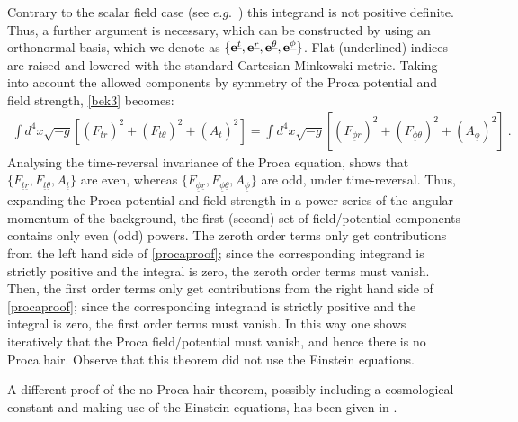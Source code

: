 \documentclass{article}
\numberwithin{equation}{section}
\begin{document}
Contrary to the scalar field case (see $e.g.$~\cite{Herdeiro:2015waa}) this integrand is not positive definite. Thus, a further argument is necessary, which can be constructed by using an orthonormal basis, which we denote as $\{ {\bf e}^{\underline{t}},{\bf e}^{\underline{r}},{\bf e}^{\underline{\theta}},{\bf e}^{\underline{\phi}}\}$. Flat (underlined) indices are raised and lowered with the standard Cartesian Minkowski metric. Taking into account the allowed components by symmetry of the Proca potential and field strength, \eqref{bek3} becomes:
\begin{equation}
\begin{array}{l}
\displaystyle{\int d^4x\sqrt{-g}\left[(F_{\underline{t}\underline{r}})^2+(F_{\underline{t}\underline{\theta}})^2+(A_{\underline{t}})^2\right]} \displaystyle{=\int d^4x\sqrt{-g}\left[(F_{\underline{\phi}\underline{r}})^2+(F_{\underline{\phi}\underline{\theta}})^2+(A_{\underline{\phi}})^2\right]} \ .
\end{array}
\label{procaproof}
\end{equation}
Analysing the time-reversal invariance of the Proca equation, shows that $\{F_{\underline{t}\underline{r}},F_{\underline{t}\underline{\theta}},A_{\underline{t}}\}$ are even, whereas $\{F_{\underline{\phi}\underline{r}},F_{\underline{\phi}\underline{\theta}},A_{\underline{\phi}}\}$ are odd, under time-reversal. Thus, expanding the Proca potential and field strength in a power series of the angular momentum of the background, the first (second) set of field/potential components contains only even (odd) powers. The zeroth order terms only get contributions from the left hand side of \eqref{procaproof}; since the corresponding integrand is strictly positive and the integral is zero, the zeroth order terms must vanish. Then, the first order terms only get contributions from the right hand side of \eqref{procaproof}; since the corresponding integrand is strictly positive and the integral is zero, the first order terms must vanish. In this way one shows iteratively that the Proca field/potential must vanish, and hence there is no Proca hair. 
Observe that this theorem did not use the Einstein equations.

A different proof of the no Proca-hair theorem, possibly including a cosmological constant  and making use of the Einstein equations, 
has been given in \cite{Bhattacharya:2011dq}.




\end{document}
